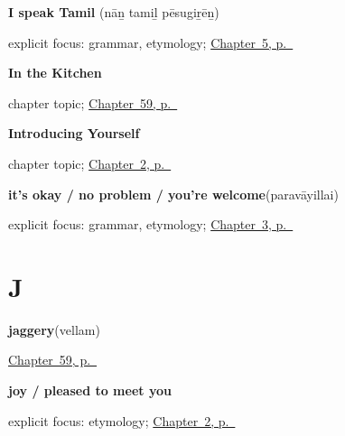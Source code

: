 \noindent\begin{minipage}[t]{\linewidth}
\raggedright
\textbf{I speak Tamil}\enspace\emph{  }\enspace(nāṉ tamiḻ pēsugiṟēṉ)\par
\footnotesize explicit focus: grammar, etymology; \hyperref[ch:first-verbs]{Chapter~5, p.~\pageref*{ch:first-verbs}}
\end{minipage}\par\smallskip

\noindent\begin{minipage}[t]{\linewidth}
\raggedright
\textbf{In the Kitchen}\par
\footnotesize chapter topic; \hyperref[ch:ta-in-the-kitchen]{Chapter~59, p.~\pageref*{ch:ta-in-the-kitchen}}
\end{minipage}\par\smallskip

\noindent\begin{minipage}[t]{\linewidth}
\raggedright
\textbf{Introducing Yourself}\par
\footnotesize chapter topic; \hyperref[ch:introductions]{Chapter~2, p.~\pageref*{ch:introductions}}
\end{minipage}\par\smallskip

\noindent\begin{minipage}[t]{\linewidth}
\raggedright
\textbf{it's okay / no problem / you're welcome}\enspace\emph{}\enspace(paravāyillai)\par
\footnotesize explicit focus: grammar, etymology; \hyperref[ch:responding]{Chapter~3, p.~\pageref*{ch:responding}}
\end{minipage}\par\smallskip

\section*{J}

\noindent\begin{minipage}[t]{\linewidth}
\raggedright
\textbf{jaggery}\enspace\emph{}\enspace(vellam)\par
\footnotesize \hyperref[ch:ta-in-the-kitchen]{Chapter~59, p.~\pageref*{ch:ta-in-the-kitchen}}
\end{minipage}\par\smallskip

\noindent\begin{minipage}[t]{\linewidth}
\raggedright
\textbf{joy / pleased to meet you}\enspace\emph{}\par
\footnotesize explicit focus: etymology; \hyperref[ch:introductions]{Chapter~2, p.~\pageref*{ch:introductions}}
\end{minipage}\par\smallskip

